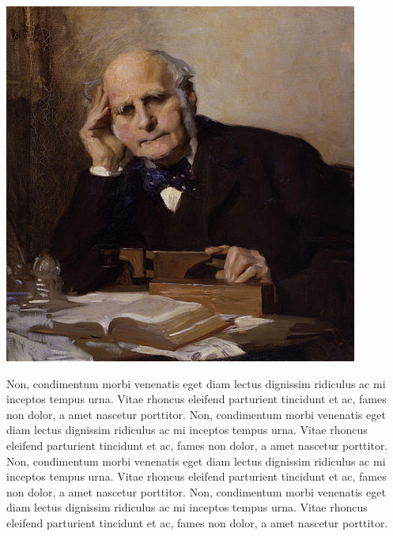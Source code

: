 \documentclass[
  oneside,
  12pt]{crumpbook}
\newenvironment{floatrightbox25}{%
  \wrapfigure{R}{.25\textwidth}%
  }{%
  \endwrapfigure}
\begin{document}
\begin{floatrightbox25}
\includegraphics[width=1\linewidth]{imgs/Francis_Galton}

\end{floatrightbox25}

Non, condimentum morbi venenatis eget diam lectus dignissim ridiculus ac mi inceptos tempus urna. Vitae rhoncus eleifend parturient tincidunt et ac, fames non dolor, a amet nascetur porttitor. Non, condimentum morbi venenatis eget diam lectus dignissim ridiculus ac mi inceptos tempus urna. Vitae rhoncus eleifend parturient tincidunt et ac, fames non dolor, a amet nascetur porttitor. Non, condimentum morbi venenatis eget diam lectus dignissim ridiculus ac mi inceptos tempus urna. Vitae rhoncus eleifend parturient tincidunt et ac, fames non dolor, a amet nascetur porttitor. Non, condimentum morbi venenatis eget diam lectus dignissim ridiculus ac mi inceptos tempus urna. Vitae rhoncus eleifend parturient tincidunt et ac, fames non dolor, a amet nascetur porttitor.
\end{document}
